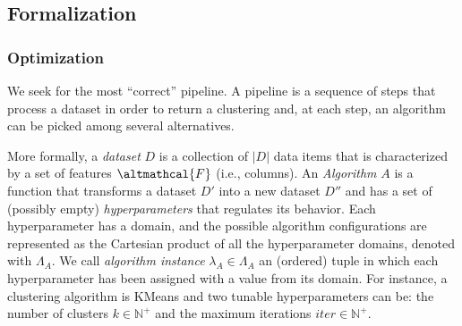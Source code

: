 \subsection{Formalization}
\label{clustering-ssec:formalization}


%
%
\subsubsection{Optimization} We seek for the most ``correct'' pipeline.
A pipeline is a sequence of steps that process a dataset in order to return a clustering and, at each step, an algorithm can be picked among several alternatives.

More formally, a \textit{dataset} $D$ is a collection of $|D|$ data items that is characterized by a set of features $\altmathcal{F}$ (i.e., columns).
%
An \textit{Algorithm} $A$ is a function that transforms a dataset $D'$ into a new dataset $D''$ and has a set of (possibly empty) \textit{hyperparameters} that regulates its behavior.
%
Each hyperparameter has a domain, and the possible algorithm configurations are represented as the Cartesian product of all the hyperparameter domains, denoted with $\Lambda_A$.
%
We call \textit{algorithm instance} $\lambda_A \in \Lambda_A$ an (ordered) tuple in which each hyperparameter has been assigned with a value from its domain.
%
For instance, a clustering algorithm is KMeans and two tunable hyperparameters can be: the number of clusters $k \in \mathbb{N}^+$ and the maximum iterations $iter \in \mathbb{N}^+$. 
%

